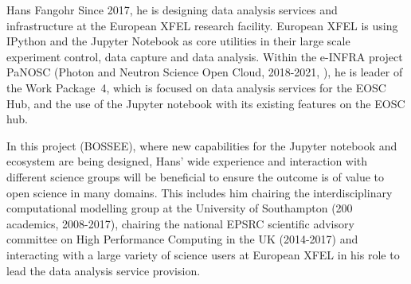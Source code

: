 \begin{participant}[type=leadPI,PM=5,gender=male]{Hans Fangohr}
  Since 2017, he is designing data analysis services and
  infrastructure at the European XFEL research facility. European XFEL
  is using IPython and the Jupyter Notebook as core utilities in their
  large scale experiment control, data capture and data
  analysis. Within the e-INFRA project PaNOSC (Photon and Neutron
  Science Open Cloud, 2018-2021, \cite{panosc}), he is leader of the
  Work Package~4, which is focused on data analysis services for the
  EOSC Hub, and the use of the Jupyter notebook with its existing
  features on the EOSC hub.

  In this project (BOSSEE), where new capabilities for the Jupyter
  notebook and ecosystem are being designed, Hans' wide experience and
  interaction with different science groups will be beneficial to
  ensure the outcome is of value to open science in many domains. This
  includes him chairing the interdisciplinary computational modelling
  group at the University of Southampton (200 academics, 2008-2017),
  chairing the national EPSRC scientific advisory committee on High
  Performance Computing in the UK (2014-2017) and interacting with a
  large variety of science users at European XFEL in his role
  to lead the data analysis service provision.
\end{participant}


